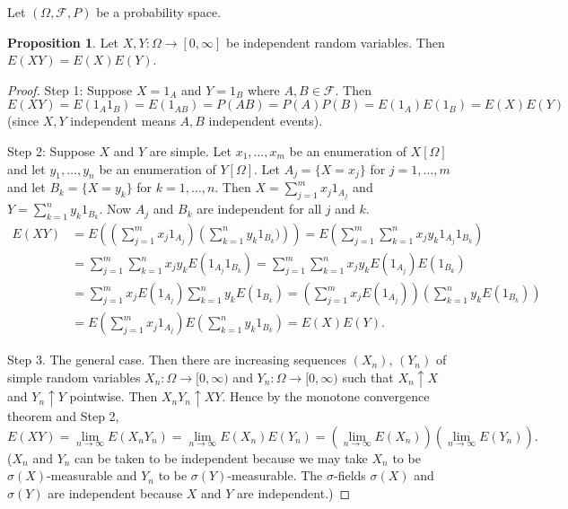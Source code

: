 \documentclass{article}
\newcommand{\F}{\mathscr{F}}
\theoremstyle{definition}
\newtheorem{proposition}[theorem]{Proposition}
\begin{document}
Let $(\Omega, \F, P)$ be a probability space.
\begin{proposition}
Let $X, Y : \Omega \longrightarrow [0, \infty]$ be independent random variables. Then $E(XY) = E(X)E(Y)$.
\end{proposition}
\begin{proof}
    Step 1: Suppose $X = 1_A$ and $Y = 1_B$ where $A, B \in \F$. Then $E(XY) = E(1_A 1_B) = E(1_{AB}) = P(AB) = P(A)P(B) = E(1_A)E(1_B) = E(X)E(Y)$ (since $X, Y$ independent means $A, B$ independent events).
    
    Step 2: Suppose $X$ and $Y$ are simple. Let $x_1, \dots, x_m$ be an enumeration of $X[\Omega]$ and let $y_1, \dots, y_n$ be an enumeration of $Y[\Omega]$. Let $A_j = \{X = x_j\}$ for $j = 1, \dots, m$ and let $B_k = \{X = y_k\}$ for $k = 1, \dots, n$. Then $X = \sum_{j=1}^m x_j 1_{A_j}$ and $Y = \sum_{k=1}^n y_k 1_{B_k}$. Now $A_j$ and $B_k$ are independent for all $j$ and $k$.
    \begin{align*}
        E(XY) &= E\left(\left(\sum_{j=1}^m x_j 1_{A_j}\right)\left(\sum_{k=1}^n y_k 1_{B_k})\right)\right) = E\left(\sum_{j=1}^m \sum_{k=1}^n x_j y_k 1_{A_j} 1_{B_k} \right) \\
            &= \sum_{j=1}^m \sum_{k=1}^n x_j y_k E(1_{A_j}1_{B_k}) = \sum_{j=1}^m \sum_{k=1}^n x_j y_k E(1_{A_j})E(1_{B_k}) \\
            &= \sum_{j=1}^m x_j E(1_{A_j}) \sum_{k=1}^n y_k E(1_{B_k}) = \left(\sum_{j=1}^m x_j E(1_{A_j})\right)\left(\sum_{k=1}^n y_k E(1_{B_k})\right) \\
            &= E\left(\sum_{j=1}^m x_j 1_{A_j}\right)E\left(\sum_{k=1}^n y_k 1_{B_k}\right) = E(X)E(Y).
    \end{align*}
    
    Step 3. The general case. Then there are increasing sequences $(X_n)$, $(Y_n)$ of simple random variables $X_n : \Omega \longrightarrow [0, \infty)$ and $Y_n : \Omega \longrightarrow [0, \infty)$ such that $X_n \uparrow X$ and $Y_n \uparrow Y$ pointwise. Then $X_n Y_n \uparrow XY$. Hence by the monotone convergence theorem and Step 2,
    \[
        E(XY) = \lim_{n\to\infty} E(X_n Y_n) = \lim_{n\to\infty} E(X_n)E(Y_n) = \left(\lim_{n\to\infty} E(X_n)\right)\left(\lim_{n\to\infty} E(Y_n)\right).
    \]
    ($X_n$ and $Y_n$ can be taken to be independent because we may take $X_n$ to be $\sigma(X)$-measurable and $Y_n$ to be $\sigma(Y)$-measurable. The $\sigma$-fields $\sigma(X)$ and $\sigma(Y)$ are independent because $X$ and $Y$ are independent.)
\end{proof}
\end{document}
